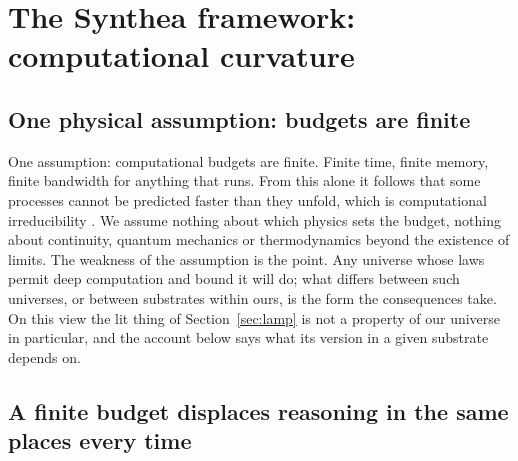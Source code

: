 \section{The Synthea framework: computational curvature}
\label{sec:model}

\subsection{One physical assumption: budgets are finite}
\label{sec:physics}

One assumption: computational budgets are finite. Finite time, finite memory, finite bandwidth for
anything that runs. From this alone it follows that some processes cannot be predicted faster than they
unfold, which is computational irreducibility \citep{wolfram2002}. We assume nothing about which physics
sets the budget, nothing about continuity, quantum mechanics or thermodynamics beyond the existence of
limits. The weakness of the assumption is the point. Any universe whose laws permit deep computation
and bound it will do; what differs between such universes, or between substrates within ours, is the
form the consequences take. On this view the lit thing of Section~\ref{sec:lamp} is not a property of
our universe in particular, and the account below says what its version in a given substrate depends
on.

\subsection{A finite budget displaces reasoning in the same places every time}
\label{sec:hocp}

